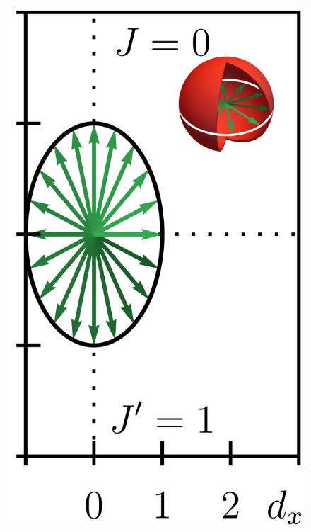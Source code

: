 \documentclass{svmono}
\begin{document}
\begin{figure}[ht]
    \includegraphics{figures/ssh_unnormalized_winding_3.png}

\end{figure}
\end{document}
